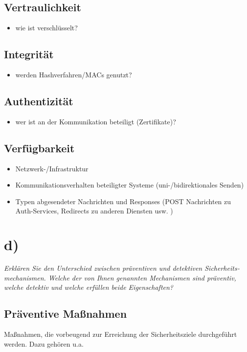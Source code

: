\subsection*{Vertraulichkeit}
\begin{itemize}
    \item wie ist verschlüsselt?
\end{itemize}

\subsection*{Integrität}
\begin{itemize}
    \item werden Hashverfahren/MACs genutzt?
\end{itemize}

\subsection*{Authentizität}
\begin{itemize}
    \item wer ist an der Kommunikation beteiligt (Zertifikate)?
\end{itemize}

\subsection*{Verfügbarkeit}
\begin{itemize}
    \item Netzwerk-/Infrastruktur
    \item Kommunikationsverhalten beteiligter Systeme (uni-/bidirektionales Senden)
    \item Typen abgesendeter Nachrichten und Responses (POST Nachrichten zu Auth-Services, Redirects zu anderen Diensten usw. )
\end{itemize}


\section{d)}

\textit{Erklären Sie den Unterschied zwischen präventiven und detektiven Sicherheits‐
mechanismen. Welche der von Ihnen genannten Mechanismen sind präventiv, welche detektiv und welche erfüllen beide Eigenschaften?}\\

\subsection*{Präventive Maßnahmen}
Maßnahmen, die vorbeugend zur Erreichung der Sicherheitsziele durchgeführt werden. Dazu gehören u.a.

